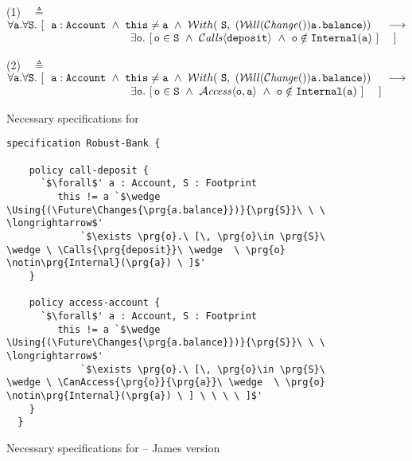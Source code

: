 \begin{figure}[htbp]

    (1)\ \  $\triangleq$\ \ $\forall \prg{a}.\forall \prg{S}.\ [ \ \  \prg{a}:\prg{Account}\   \wedge\   \prg{this}\neq\prg{a} \ \wedge\ \Using{(\Future\Changes{\prg{a.balance}})}{\prg{S}}\ \ \   \
    \longrightarrow$ \\
 $\strut \hspace{3.9cm} \hfill \exists \prg{o}.\ [\, \prg{o}\in \prg{S}\ \wedge \ \Calls{\prg{deposit}}\ \wedge  \ \prg{o} \notin\prg{Internal}(\prg{a}) \ ] \ \ \ \ ]$

\vspace{.1cm}

    (2)\ \  $\triangleq$\ \ $\forall \prg{a}.\forall \prg{S}.\ [ \ \  \prg{a}:\prg{Account}\   \wedge\   \prg{this}\neq\prg{a} \ \wedge\ \Using{(\Future\Changes{\prg{a.balance}})}{\prg{S}}\ \ \   \
    \longrightarrow$ \\
 $\strut \hspace{3.9cm} \hfill \exists \prg{o}.\ [\, \prg{o}\in \prg{S}\ \wedge \ \CanAccess{\prg{o}}{\prg{a}}\ \wedge  \ \prg{o} \notin\prg{Internal}(\prg{a}) \ ] \ \ \ \ ]$


\caption{Necessary specifications for }
\label{fig:nec}
\end{figure}


\begin{figure}[tbp]
\begin{lstlisting}[escapeinside=`']
  specification Robust-Bank {

    policy call-deposit {
      `$\forall$' a : Account, S : Footprint
         this != a `$\wedge \Using{(\Future\Changes{\prg{a.balance}})}{\prg{S}}\ \ \ \longrightarrow$'
             `$\exists \prg{o}.\ [\, \prg{o}\in \prg{S}\ \wedge \ \Calls{\prg{deposit}}\ \wedge  \ \prg{o} \notin\prg{Internal}(\prg{a}) \ ]$'  
    }

    policy access-account {
      `$\forall$' a : Account, S : Footprint
         this != a `$\wedge \Using{(\Future\Changes{\prg{a.balance}})}{\prg{S}}\ \ \ \longrightarrow$'
             `$\exists \prg{o}.\ [\, \prg{o}\in \prg{S}\ \wedge \ \CanAccess{\prg{o}}{\prg{a}}\ \wedge  \ \prg{o} \notin\prg{Internal}(\prg{a}) \ ] \ \ \ \ ]$'
    }
  }
\end{lstlisting}
\caption{Necessary specifications for  -- James version}
\label{fig:kjx}
\end{figure}


